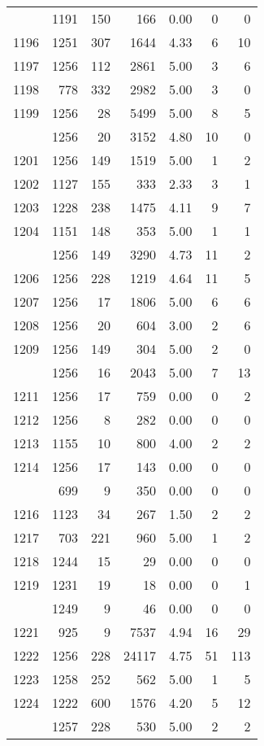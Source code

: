 \documentclass[
]{article}
\begin{document}
\begin{table}
\begin{tabular}[t]{lrrrrrr}
\addlinespace
1195 & 1191 & 150 & 166 & 0.00 & 0 & 0\\
1196 & 1251 & 307 & 1644 & 4.33 & 6 & 10\\
1197 & 1256 & 112 & 2861 & 5.00 & 3 & 6\\
1198 & 778 & 332 & 2982 & 5.00 & 3 & 0\\
1199 & 1256 & 28 & 5499 & 5.00 & 8 & 5\\
\addlinespace
1200 & 1256 & 20 & 3152 & 4.80 & 10 & 0\\
1201 & 1256 & 149 & 1519 & 5.00 & 1 & 2\\
1202 & 1127 & 155 & 333 & 2.33 & 3 & 1\\
1203 & 1228 & 238 & 1475 & 4.11 & 9 & 7\\
1204 & 1151 & 148 & 353 & 5.00 & 1 & 1\\
\addlinespace
1205 & 1256 & 149 & 3290 & 4.73 & 11 & 2\\
1206 & 1256 & 228 & 1219 & 4.64 & 11 & 5\\
1207 & 1256 & 17 & 1806 & 5.00 & 6 & 6\\
1208 & 1256 & 20 & 604 & 3.00 & 2 & 6\\
1209 & 1256 & 149 & 304 & 5.00 & 2 & 0\\
\addlinespace
1210 & 1256 & 16 & 2043 & 5.00 & 7 & 13\\
1211 & 1256 & 17 & 759 & 0.00 & 0 & 2\\
1212 & 1256 & 8 & 282 & 0.00 & 0 & 0\\
1213 & 1155 & 10 & 800 & 4.00 & 2 & 2\\
1214 & 1256 & 17 & 143 & 0.00 & 0 & 0\\
\addlinespace
1215 & 699 & 9 & 350 & 0.00 & 0 & 0\\
1216 & 1123 & 34 & 267 & 1.50 & 2 & 2\\
1217 & 703 & 221 & 960 & 5.00 & 1 & 2\\
1218 & 1244 & 15 & 29 & 0.00 & 0 & 0\\
1219 & 1231 & 19 & 18 & 0.00 & 0 & 1\\
\addlinespace
1220 & 1249 & 9 & 46 & 0.00 & 0 & 0\\
1221 & 925 & 9 & 7537 & 4.94 & 16 & 29\\
1222 & 1256 & 228 & 24117 & 4.75 & 51 & 113\\
1223 & 1258 & 252 & 562 & 5.00 & 1 & 5\\
1224 & 1222 & 600 & 1576 & 4.20 & 5 & 12\\
\addlinespace
1225 & 1257 & 228 & 530 & 5.00 & 2 & 2\\

\end{tabular}
\end{table}
\end{document}
